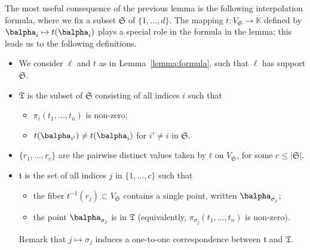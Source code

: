 \documentclass[12pt]{article}
\def\Kbar {{\ensuremath{\overline{\mathbb{K}}}}}
\begin{document}
\noindent 
The most useful consequence of the previous lemma is the following
interpolation formula, where we fix a subset $\mathfrak{S}$ of 
$\{1,\dots,d\}$. The mapping $t:V_\mathfrak{S} \to \Kbar$
defined by $\balpha_i \mapsto t(\balpha_{i})$ plays a special role in
the formula in the lemma; this leads us to the following definitions.
\begin{itemize}
\item We consider $\ell$ and $t$ as in Lemma~\ref{lemma:formula}, such
  that $\ell$ has support $\mathfrak{S}$.
\item $\mathfrak{T}$ is the subset of $\mathfrak{S}$ consisting of
  all indices $i$ such that 
  \begin{itemize}
  \item $\pi_i(t_1,\dots,t_n)$ is non-zero;
  \item $t(\balpha_{i'}) \ne t(\balpha_i)$ for $i' \ne i$ in $\mathfrak{S}$.
  \end{itemize}
\item $\{r_1,\dots,r_c\}$ are the pairwise distinct values taken by $t$ on
  $V_\mathfrak{S}$, for some $c \le |\mathfrak{S}|$.
\item $\mathfrak{t}$ is the set of all indices $j$ in
  $\{1,\dots,c\}$ such that
  \begin{itemize}
  \item the fiber $t^{-1}(r_j) \subset V_{\mathfrak{S}}$ contains a single
    point, written $\balpha_{\sigma_j}$;
  \item the point $\balpha_{\sigma_j}$ is in $\mathfrak{T}$
    (equivalently,  $\pi_{\sigma_j}(t_1,\dots,t_n)$ is non-zero).
  \end{itemize}
  Remark that $j \mapsto \sigma_j$ induces a one-to-one correspondence
  between  $\mathfrak{t}$ and  $\mathfrak{T}$.
\end{itemize}
\end{document}
